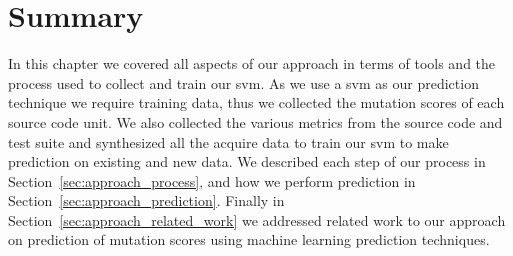 \section{Summary}
\label{sec:approach_summary}
In this chapter we covered all aspects of our approach in terms of tools and the process used to collect and train our \gls{svm}. As we use a \gls{svm} as our prediction technique we require training data, thus we collected the mutation scores of each source code unit. We also collected the various metrics from the source code and test suite and synthesized all the acquire data to train our \gls{svm} to make prediction on existing and new data. We described each step of our process in Section~\ref{sec:approach_process}, and how we perform prediction in Section~\ref{sec:approach_prediction}. Finally in Section~\ref{sec:approach_related_work} we addressed related work to our approach on prediction of mutation scores using machine learning prediction techniques.
